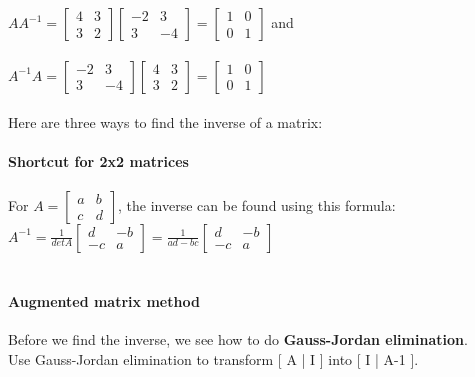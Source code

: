 \documentclass[12pt, right open]{memoir}
\begin{document}
$
AA^{-1} = 
\begin{bmatrix}
4 & 3 \\
3 & 2 
\end{bmatrix}
\begin{bmatrix}
-2 & 3 \\
3 & -4 
\end{bmatrix}
=
\begin{bmatrix}
1 & 0 \\
0 & 1 
\end{bmatrix}
$ and \\ \\
$
A^{-1}A = 
\begin{bmatrix}
-2 & 3 \\
3 & -4 
\end{bmatrix}
\begin{bmatrix}
4 & 3 \\
3 & 2 
\end{bmatrix}
=
\begin{bmatrix}
1 & 0 \\
0 & 1 
\end{bmatrix}
$ \\ \\

Here are three ways to find the inverse of a matrix:

\paragraph{Shortcut for 2x2 matrices}
For 
$
A = 
\begin{bmatrix}
a & b \\
c & d 
\end{bmatrix}
$, the inverse can be found using this formula: \\
$ A^{-1} = \frac{1}{det A}
\begin{bmatrix}
d & -b \\
-c & a 
\end{bmatrix}
=
\frac{1}{ad-bc}
\begin{bmatrix}
d & -b \\
-c & a 
\end{bmatrix}
$ \\ \\

\paragraph{Augmented matrix method}

Before we find the inverse, we see how to do \textbf{Gauss-Jordan elimination}. \\
Use Gauss-Jordan elimination to transform [ A | I ] into [ I | A-1 ].
\end{document}
